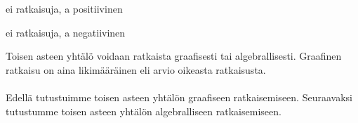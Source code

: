 ei ratkaisuja, a positiivinen

\begin{lukusuora}{-2}{2}{4}
\end{lukusuora}

ei ratkaisuja, a negatiivinen

\begin{lukusuora}{-2}{2}{4}
\end{lukusuora}



Toisen asteen yhtälö voidaan ratkaista graafisesti tai algebrallisesti. Graafinen ratkaisu on aina likimääräinen eli arvio oikeasta ratkaisusta. \\ \\ Edellä tutustuimme toisen asteen yhtälön graafiseen ratkaisemiseen. Seuraavaksi tutustumme toisen asteen yhtälön algebralliseen ratkaisemiseen.
